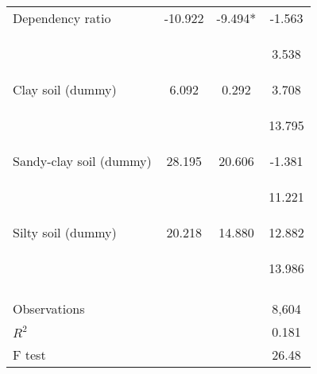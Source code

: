 \begin{center}
\begin{tabular}{lccc}
Dependency ratio & -10.922 & -9.494* & -1.563 \\
\vspace{4pt} & \begin{footnotesize}\end{footnotesize} & \begin{footnotesize}\end{footnotesize} & \begin{footnotesize}3.538\end{footnotesize} \\
Clay soil (dummy) & 6.092 & 0.292 & 3.708 \\
\vspace{4pt} & \begin{footnotesize}\end{footnotesize} & \begin{footnotesize}\end{footnotesize} & \begin{footnotesize}13.795\end{footnotesize} \\
Sandy-clay soil (dummy) & 28.195 & 20.606 & -1.381 \\
\vspace{4pt} & \begin{footnotesize}\end{footnotesize} & \begin{footnotesize}\end{footnotesize} & \begin{footnotesize}11.221\end{footnotesize} \\
Silty soil (dummy) & 20.218 & 14.880 & 12.882 \\
 & \begin{footnotesize}\end{footnotesize} & \begin{footnotesize}\end{footnotesize} & \begin{footnotesize}13.986\end{footnotesize} \\
\vspace{4pt} & \begin{footnotesize}\end{footnotesize} & \begin{footnotesize}\end{footnotesize} & \begin{footnotesize}\end{footnotesize} \\
Observations &  &  & 8,604 \\
$R^2$ &  &  & 0.181 \\
 F test &  &  & 26.48 \\ \hline
\end{tabular}
\end{center}
